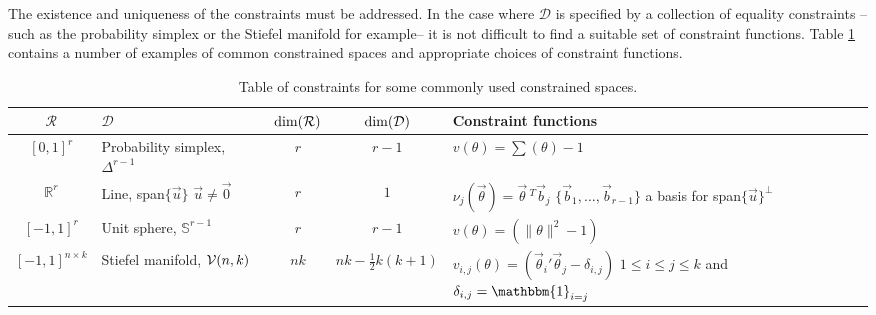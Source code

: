 \documentclass[10pt,fleqn]{article} \pdfoutput=1
\DeclareMathOperator{\1}{\mathbbm{1}} \DeclareMathOperator{\bigO}{\mc O}
\begin{document}
The existence and uniqueness of the constraints must be addressed.  In the
case where $\mathcal{D}$ is specified by a collection of equality
constraints -- such as the probability simplex or the Stiefel manifold for
example--  it is not difficult to find a suitable set of constraint
functions. Table \ref{TABLE:Equality_constraints_examples} contains a
number of examples of common constrained spaces and appropriate choices of
constraint functions.  \renewcommand{\arraystretch}{1.5} \begin{table}[h!]
\begin{center} \begin{tabular}{| c | m{4 cm} | c | c | m{6cm} |}
\hline $\mathcal{R}$                           &
$\mathcal{D}$                                  &
$\dim(\mathcal{R})$                                  &
$\dim( \mathcal{D})$                                 & Constraint functions                                  \\ \hline $[0,1]^r$ &
Probability simplex, $\Delta^{r-1}$            & $r$                            & $r-1$ & $v(\theta)
= \sum(\theta) -1$                                                                                     \\ \hline $\mathbb{R}^r$ & Line,
span$\{\vec{u}\}$ \newline $\vec{u}\ne\vec{0}$ & $r$                            & $1$
&
$\nu_j(\vec{\theta}) = \vec{\theta}\,^T\vec{b}_j$ \newline
$\{\vec{b}_1,\dots,\vec{b}_{r-1}\}$ a basis for
span$\{\vec{u}\}^\perp$                                                                                \\ \hline $[-1,1]^r$ & Unit
sphere, $\mathbb{S}^{r-1}$                     & $r$                            & $r-1$ & $v(\theta) =
(\|\theta\|^2 -1)$                                                                                     \\ \hline $[-1,1]^{n\times
k}$                                            & Stiefel manifold, $\mathcal{V}(n,k)$ & $nk$  & $nk -
\frac{1}{2}k(k+1)$                             & $v_{i,j}(\theta) = (
\vec{\theta}_i'\vec{\theta}_j- \delta_{i,j})$ \newline
$1\le i \le j \le k$ and $\delta_{i,j} = \mathbbm{1}_{i=j}$
\\ \hline\end{tabular} \end{center} \caption{Table of
constraints for some commonly used constrained spaces.}
\label{TABLE:Equality_constraints_examples} \end{table}
\end{document}
